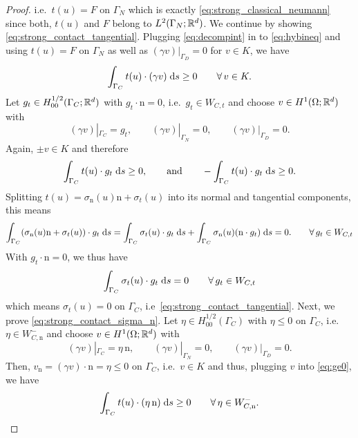 \begin{proof}
	i.e.\ $t(u) = F$ on $\Gamma_N$ which is exactly \eqref{eq:strong_classical_neumann} since both, $t(u)$ and $F$ belong to $L^2(\Gamma_N;{\mathbb R}^d)$. We continue by showing \eqref{eq:strong_contact_tangential}. Plugging \eqref{eq:decompint} in to \eqref{eq:hybineq} and using $t(u) = F$ on $\Gamma_N$ as well as $(\gamma v)|_{\Gamma_D} = 0$ for $v\in K$, we have
	\begin{equation}\label{eq:ge0}
		\int_{\Gamma_C}t(u)\cdot(\gamma v)\;{{\mathrm{d}} s} \ge 0\qquad\forall\,v\in K.
	\end{equation}
	Let $g_t\in H_{00}^{1/2}(\Gamma_C;{\mathbb R}^d)$ with $g_t\cdot\mathrm{n} = 0$, i.e.\ $g_t\in W_{C,t}$ and choose $v\in H^1(\Omega;{\mathbb R}^d)$ with
	\begin{equation*}
		(\gamma v)|_{\Gamma_C} = g_t,\qquad (\gamma v)|_{\Gamma_N} = 0,\qquad (\gamma v)|_{\Gamma_D} = 0.
	\end{equation*}
	Again, $\pm v\in K$ and therefore
	\begin{equation*}
		\int_{\Gamma_C}t(u)\cdot g_t\;{{\mathrm{d}} s}\ge 0,\qquad\text{and}\qquad -\int_{\Gamma_C}t(u)\cdot g_t\;{{\mathrm{d}} s}\ge 0.
	\end{equation*}
	Splitting $t(u) = \sigma_\mathrm{n}(u)\mathrm{n}+\sigma_t(u)$ into its normal and tangential components, this means
	\begin{equation*}
		\int_{\Gamma_C} (\sigma_\mathrm{n}(u)\mathrm{n}+\sigma_t(u))\cdot g_t\;{{\mathrm{d}} s} = \int_{\Gamma_C}\sigma_t(u)\cdot g_t\;{{\mathrm{d}} s} + \int_{\Gamma_C} \sigma_\mathrm{n}(u)(\mathrm{n}\cdot g_t)\;{{\mathrm{d}} s} = 0.\qquad\forall\,g_t\in W_{C,t}
	\end{equation*}
	With  $g_t\cdot \mathrm{n} = 0$, we thus have
	\begin{equation*}
		\int_{\Gamma_C}\sigma_t(u)\cdot g_t\;{{\mathrm{d}} s} = 0\qquad \forall\, g_t\in W_{C,t}
	\end{equation*}
	which means $\sigma_t(u)=0$ on $\Gamma_C$, i.e\ \eqref{eq:strong_contact_tangential}. Next, we prove \eqref{eq:strong_contact_sigma_n}. Let $\eta\in H_{00}^{1/2}(\Gamma_C)$ with $\eta\le 0$ on $\Gamma_C$, i.e. $\eta\in W_{C,\mathrm{n}}^-$ and choose $v\in H^1(\Omega;{\mathbb R}^d)$ with
	\begin{equation*}
		(\gamma v)|_{\Gamma_C} = \eta\,\mathrm{n},\qquad (\gamma v)|_{\Gamma_N}=0,\qquad (\gamma v)|_{\Gamma_D} = 0.
	\end{equation*}
	Then, $v_\mathrm{n} = (\gamma v)\cdot\mathrm{n} = \eta \le 0$ on $\Gamma_C$, i.e.\ $v\in K$ and thus, plugging $v$ into \eqref{eq:ge0}, we have
	\begin{equation*}
		\int_{\Gamma_C}t(u)\cdot(\eta\,\mathrm{n})\;\ds\ge 0\qquad\forall\,\eta\in W_{C,\mathrm{n}}^-.

\end{equation*}
\end{proof}
